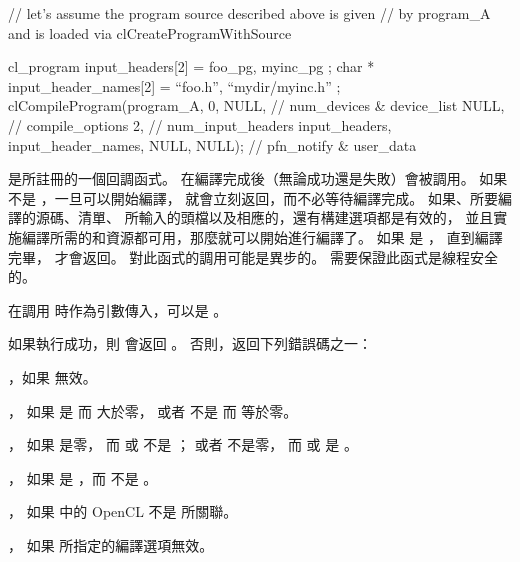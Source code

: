 // let’s assume the program source described above is given
// by program_A and is loaded via clCreateProgramWithSource

cl_program input_headers[2] = { foo_pg, myinc_pg };
char * input_header_names[2] = { “foo.h”, “mydir/myinc.h” };
clCompileProgram(program_A,
		0, NULL,	// num_devices & device_list
		NULL,		// compile_options
		2,		// num_input_headers
		input_headers,
		input_header_names,
		NULL, NULL);	// pfn_notify & user_data
\stopclc

 是所註冊的一個回調函式。
在編譯完成後（無論成功還是失敗）會被調用。
如果  不是 ，一旦可以開始編譯，
 就會立刻返回，而不必等待編譯完成。
如果、所要編譯的源碼、清單、
所輸入的頭檔以及相應的，還有構建選項都是有效的，
並且實施編譯所需的和資源都可用，那麼就可以開始進行編譯了。
如果  是 ，
直到編譯完畢，  才會返回。
對此函式的調用可能是異步的。
需要保證此函式是線程安全的。

 在調用  時作為引數傳入，可以是 。

如果執行成功，則  會返回 。
否則，返回下列錯誤碼之一：
\startigBase
\item {}，如果  無效。

\item {}，
如果  是  而  大於零，
或者  不是  而  等於零。

\item {}，
如果  是零，
而  或  不是 ；
或者  不是零，
而  或  是 。

\item {}，
如果  是 ，而  不是 。

\item {}，
如果  中的 OpenCL 不是  所關聯。

\item {}，
如果  所指定的編譯選項無效。

